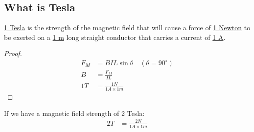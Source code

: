 \subsection{What is Tesla}
\underline{1 Tesla} is the strength of the magnetic field that will cause a force of \underline{1 Newton} to be exerted on a \underline{1 m} long straight conductor 
that carries a current of \underline{1 A}.
\begin{proof}
    \begin{align*}
        F_M &= BIL\sin\theta \quad (\theta = 90^{\circ})\\
        B &= \frac{F_M}{IL}\\
        1T &= \frac{1N}{1A \times 1m}
    \end{align*}
   
\end{proof}

If we have a magnetic field strength of 2 Tesla:
\begin{align*}
    2T &= \frac{2N}{1A \times 1m}
\end{align*}
